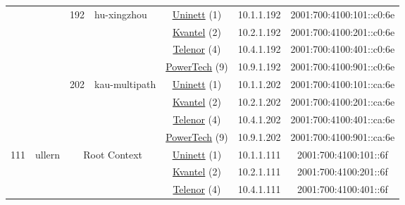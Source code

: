 \begin{small}
\begin{center}
\begin{longtable}{|c|c|c|c|c|c|c|c|}
  &  & \multirow{4}{*}{\tiny{192}} & \multicolumn{1}{|l|}{\multirow{4}{*}{\tiny{hu-xingzhou}}} & \multicolumn{2}{|c|}{\tiny{\href{https://www.uninett.no}{Uninett} (1)}} & \tiny{10.1.1.192} & \tiny{2001:700:4100:101::c0:6e} \\* \cline{5-5}\cline{6-6}\cline{7-7}\cline{8-8}
  &  &  &  & \multicolumn{2}{|c|}{\tiny{\href{http://kvantel.no}{Kvantel} (2)}} & \tiny{10.2.1.192} & \tiny{2001:700:4100:201::c0:6e} \\* \cline{5-5}\cline{6-6}\cline{7-7}\cline{8-8}
  &  &  &  & \multicolumn{2}{|c|}{\tiny{\href{https://www.telenor.no}{Telenor} (4)}} & \tiny{10.4.1.192} & \tiny{2001:700:4100:401::c0:6e} \\* \cline{5-5}\cline{6-6}\cline{7-7}\cline{8-8}
  &  &  &  & \multicolumn{2}{|c|}{\tiny{\href{http://www.powertech.no}{PowerTech} (9)}} & \tiny{10.9.1.192} & \tiny{2001:700:4100:901::c0:6e} \\* \cline{3-3}\cline{4-4}\cline{5-5}\cline{6-6}\cline{7-7}\cline{8-8}
  &  & \multirow{4}{*}{\tiny{202}} & \multicolumn{1}{|l|}{\multirow{4}{*}{\tiny{kau-multipath}}} & \multicolumn{2}{|c|}{\tiny{\href{https://www.uninett.no}{Uninett} (1)}} & \tiny{10.1.1.202} & \tiny{2001:700:4100:101::ca:6e} \\* \cline{5-5}\cline{6-6}\cline{7-7}\cline{8-8}
  &  &  &  & \multicolumn{2}{|c|}{\tiny{\href{http://kvantel.no}{Kvantel} (2)}} & \tiny{10.2.1.202} & \tiny{2001:700:4100:201::ca:6e} \\* \cline{5-5}\cline{6-6}\cline{7-7}\cline{8-8}
  &  &  &  & \multicolumn{2}{|c|}{\tiny{\href{https://www.telenor.no}{Telenor} (4)}} & \tiny{10.4.1.202} & \tiny{2001:700:4100:401::ca:6e} \\* \cline{5-5}\cline{6-6}\cline{7-7}\cline{8-8}
  &  &  &  & \multicolumn{2}{|c|}{\tiny{\href{http://www.powertech.no}{PowerTech} (9)}} & \tiny{10.9.1.202} & \tiny{2001:700:4100:901::ca:6e} \\ \hline
 \multirow{40}{*}{\tiny{111}} & \multicolumn{1}{|l|}{\multirow{40}{*}{\tiny{ullern}}} & \multicolumn{2}{|c|}{\multirow{4}{*}{\tiny{Root Context}}} & \multicolumn{2}{|c|}{\tiny{\href{https://www.uninett.no}{Uninett} (1)}} & \tiny{10.1.1.111} & \tiny{2001:700:4100:101::6f} \\* \cline{5-5}\cline{6-6}\cline{7-7}\cline{8-8}
  &  & \multicolumn{2}{|c|}{} & \multicolumn{2}{|c|}{\tiny{\href{http://kvantel.no}{Kvantel} (2)}} & \tiny{10.2.1.111} & \tiny{2001:700:4100:201::6f} \\* \cline{5-5}\cline{6-6}\cline{7-7}\cline{8-8}
  &  & \multicolumn{2}{|c|}{} & \multicolumn{2}{|c|}{\tiny{\href{https://www.telenor.no}{Telenor} (4)}} & \tiny{10.4.1.111} & \tiny{2001:700:4100:401::6f} \\* \cline{5-5}\cline{6-6}\cline{7-7}\cline{8-8}

\end{longtable}
\end{center}
\end{small}
